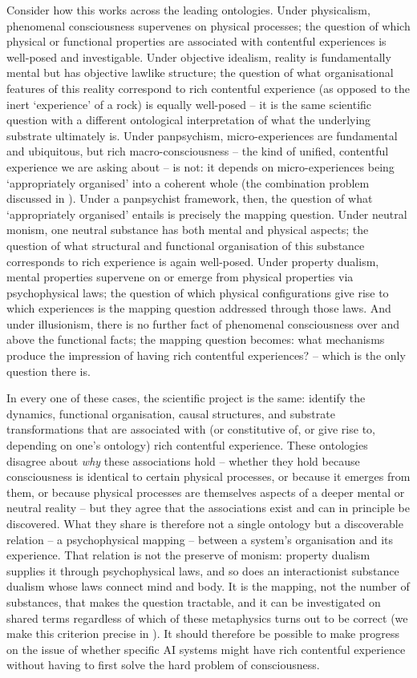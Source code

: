 \documentclass[11pt, a4paper, onecolumn, gdm]{google}
\begin{document}
Consider how this works across the leading ontologies.
Under physicalism, phenomenal consciousness supervenes on physical processes; the question of which physical or functional properties are associated with contentful experiences is well-posed and investigable.
Under objective idealism, reality is fundamentally mental but has objective lawlike structure; the question of what organisational features of this reality correspond to rich contentful experience (as opposed to the inert `experience' of a rock) is equally well-posed -- it is the same scientific question with a different ontological interpretation of what the underlying substrate ultimately is.
Under panpsychism, micro-experiences are fundamental and ubiquitous, but rich macro-consciousness -- the kind of unified, contentful experience we are asking about -- is not: it depends on micro-experiences being `appropriately organised' into a coherent whole (the combination problem discussed in ).
Under a panpsychist framework, then, the question of what `appropriately organised' entails is precisely the mapping question.
Under neutral monism, one neutral substance has both mental and physical aspects; the question of what structural and functional organisation of this substance corresponds to rich experience is again well-posed.
Under property dualism, mental properties supervene on or emerge from physical properties via psychophysical laws; the question of which physical configurations give rise to which experiences is the mapping question addressed through those laws.
And under illusionism, there is no further fact of phenomenal consciousness over and above the functional facts; the mapping question becomes: what mechanisms produce the impression of having rich contentful experiences? -- which is the only question there is.

In every one of these cases, the scientific project is the same: identify the dynamics, functional organisation, causal structures, and substrate transformations that are associated with (or constitutive of, or give rise to, depending on one's ontology) rich contentful experience.
These ontologies disagree about \emph{why} these associations hold -- whether they hold because consciousness is identical to certain physical processes, or because it emerges from them, or because physical processes are themselves aspects of a deeper mental or neutral reality -- but they agree that the associations exist and can in principle be discovered.
What they share is therefore not a single ontology but a discoverable relation -- a psychophysical mapping -- between a system's organisation and its experience.
That relation is not the preserve of monism: property dualism supplies it through psychophysical laws, and so does an interactionist substance dualism whose laws connect mind and body.
It is the mapping, not the number of substances, that makes the question tractable, and it can be investigated on shared terms regardless of which of these metaphysics turns out to be correct (we make this criterion precise in ).
It should therefore be possible to make progress on the issue of whether specific AI systems might have rich contentful experience without having to first solve the hard problem of consciousness.
\end{document}
